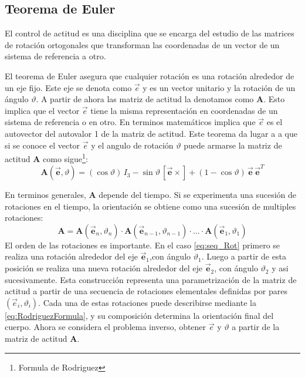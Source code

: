 \subsection{Teorema de Euler}
El control de actitud es una disciplina que se encarga del estudio de las matrices de rotación ortogonales que transforman las coordenadas de un vector de un sistema de referencia a otro. 

El teorema de Euler asegura que cualquier rotación es una rotación alrededor de un eje fijo. Este eje se denota como $\vec{e}$ y es un vector unitario y la rotación de un ángulo $\vartheta$. A partir de ahora las matriz de actitud la denotamos como $\textbf{A}$. Esto implica que el vector $\vec{e}$ tiene la misma representación en coordenadas de un sistema de referencia o en otro. En terminos matemáticos implica que $\vec{e}$ es el autovector del autovalor 1 de la matriz de actitud. Este teorema da lugar a a que si se conoce el vector $\vec{e}$ y el angulo de rotación $\vartheta$ puede armarse la matriz de actitud \textbf{A} como sigue\footnote{Formula de Rodriguez}: 
\begin{equation}\label{eq:RodriguezFormula}
\mathbf{A}(\vec{\mathbf{e}}, \vartheta) = (\cos \vartheta)\, I_3 - \sin \vartheta\, [\vec{\mathbf{e}}\times] + (1 - \cos \vartheta)\, \vec{\mathbf{e}}\, \vec{\mathbf{e}}^T
\end{equation}

En terminos generales, $\mathbf{A}$ depende del tiempo. Si se experimenta una sucesión de rotaciones en el tiempo, la orientación se obtiene como una sucesión de multiples rotaciones:   
\begin{equation}\label{eq:seq_Rot}
\mathbf{A} = \mathbf{A}(\vec{\mathbf{e}}_n, \vartheta_n) \cdot \mathbf{A}(\vec{\mathbf{e}}_{n-1}, \vartheta_{n-1}) \cdot \ldots \cdot \mathbf{A}(\vec{\mathbf{e}}_1, \vartheta_1)
\end{equation}
El orden de las rotaciones es importante. En el caso \ref{eq:seq_Rot} primero se realiza una rotación alrededor del eje 
$\vec{\mathbf{e}}_1$,con ángulo $\vartheta_1$. Luego a partir de esta posición se realiza una nueva rotación alrededor del eje $\vec{\mathbf{e}}_2$, con ángulo $\vartheta_2$ y asi sucesivamente. Esta construcción representa una parametrización de la matriz de actitud a partir de una secuencia de rotaciones elementales definidas por pares $(\vec{e}_i,\vartheta_i)$. Cada una de estas rotaciones puede describirse mediante la \ref{eq:RodriguezFormula}, y su composición determina la orientación final del cuerpo. Ahora se considera el problema inverso, obtener $\vec{e}$ y $\vartheta$ a partir de la matriz de actitud $\mathbf{A}$.




